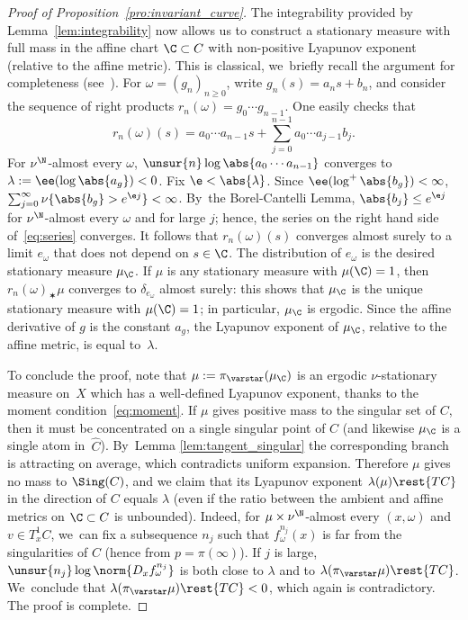 \begin{proof}[Proof of Proposition~\ref{pro:invariant_curve}]
The integrability provided by Lemma~\ref{lem:integrability} now allows us to construct a stationary
measure with full mass in the affine chart $\C\subset C$ with non-positive Lyapunov exponent
(relative to the affine metric).
This is classical, we~briefly recall the argument for completeness (see~\cite{brandt}).
For $\omega = (g_n)_{n\geq 0}$, write $g_n(s) = a_ns+b_n$, and
consider the sequence of right products
$r_n(\omega) = g_0\cdots g_{n-1}$. One easily checks that
\begin{equation}\label{eq:series}
r_n(\omega) (s) = a_{0}\cdots a_{n-1}s + \sum_{j=0}^{n-1} a_{0}\cdots a_{j-1} b_{j}.
\end{equation}
For $\nu^\N$-almost every $\omega$, $\unsur{n} \log \abs{a_{0}\cdots a_{n-1}}$ converges to $\lambda := \ee(\log\abs{a_g})<0$.
Fix $\e < \abs{\lambda}$. Since $\ee(\log^+\abs{b_g})<\infty$, $\sum_{j=0}^\infty \nu\{ \abs{b_g} > e^{\e j} \} <\infty$. By~the Borel-Cantelli Lemma, $\abs{b_{j}}\leq e^{\e j} $ for $\nu^\N$-almost every $\omega$ and for large $j$; hence, the series on
the right hand side of~\eqref{eq:series} converges. It follows that $r_n(\omega) (s) $ converges almost surely to a limit $e_\omega$
that does not depend on $s\in \C$. The distribution of $e_\omega$ is the desired stationary measure $\mu_\C$.
If $\mu$ is any stationary measure with $\mu(\C) = 1$, then $r_n(\omega)_\varstar \mu$ converges to
$\delta_{e_\omega}$ almost surely: this shows that $\mu_\C$ is the unique stationary measure
with $\mu(\C) = 1$; in particular, $\mu_\C$ is ergodic.
Since the affine derivative of $g$ is the constant $a_g$,
the Lyapunov exponent of $\mu_\C$, relative to the affine metric, is equal to~$\lambda$.

To conclude the proof, note that $\mu:=\pi_\varstar (\mu_\C)$ is an ergodic
$\nu$-stationary measure on~$X$ which has a well-defined Lyapunov exponent, thanks to the moment condition~\eqref{eq:moment}.
If $\mu$ gives positive mass to the singular set of $C$, then it must be concentrated on a
single singular point of $C$ (and likewise $\mu_\C$ is a single atom in~$\hat C$). By~Lemma \ref{lem:tangent_singular} the corresponding branch is
attracting on average, which contradicts uniform expansion. Therefore $\mu$ gives no mass to
$\Sing(C)$, and we claim that its Lyapunov exponent $\lambda(\mu)\rest{TC}$
in the direction of $C$ equals $\lambda$ (even if the ratio between the
ambient and affine metrics on $\C\subset C$ is unbounded). Indeed, for
$\mu\times \nu^\N$-almost every $(x,\omega)$ and $v\in T_x^1C$, we~can fix a subsequence $n_j$ such that $f^{n_j}_\omega(x)$ is far
from the singularities of $C$ (hence from $p=\pi(\infty)$). If $j$ is large,
$\unsur{n_j}\log\norm{D_xf^{n_j}_\omega}$ is both close to $\lambda$ and to
$\lambda (\pi_\varstar \mu)\rest{TC}$. We~conclude that $\lambda (\pi_\varstar \mu)\rest{TC}<0$, which again is contradictory. The proof is complete. \end{proof}

